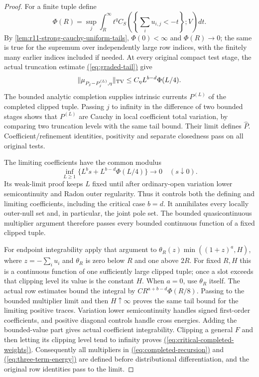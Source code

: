 \documentclass[11pt,reqno]{amsart}
\theoremstyle{definition}
\theoremstyle{remark}
\numberwithin{equation}{section}
\newcommand{\MathEqref}[1]{\begingroup\hypersetup{linkcolor=EquationLink}\hyperref[#1]{(\ref*{#1})}\endgroup}
\begin{document}
\begin{proof}
For a finite tuple define
\begin{equation}\label{eq:joint-tail-function}
 \Phi(R)=\sup_j\int_R^\infty t^q
          C_S\!\left(\left\{\sum_i u_{i,j}<-t\right\};V\right)dt.
\end{equation}
By \cref{lem:r11-strong-cauchy-uniform-tails},
$\Phi(0)<\infty$ and $\Phi(R)\to0$; the same is true for
the supremum over independently large row indices, with the
finitely many earlier indices included if needed. At every
original compact test stage, the actual truncation estimate \MathEqref{eq:graded-tail} give
\begin{equation}\label{eq:truncation-error}
 \|\mu_{P_j-P_j^{(L)},\eta}\|_{\rm TV}
             \leq C_\eta L^{b-d}\Phi(L/4).
\end{equation}
The bounded analytic completion supplies intrinsic currents
$P^{(L)}$ of the completed clipped tuple. Passing $j$ to
infinity in the difference of two bounded stages shows that
$P^{(L)}$ are Cauchy in local coefficient total variation,
by comparing two truncation levels with the same tail bound. Their limit defines $\widehat P$.
Coefficient/refinement identities, positivity and separate
closedness pass on all original tests.

The limiting coefficients have the common modulus
\begin{equation}\label{eq:coefficient-modulus}
    \inf_{L\geq1}\{L^b s+L^{b-d}\Phi(L/4)\}
                              \longrightarrow0\quad(s\downarrow0).
\end{equation}
Its weak-limit proof keeps $L$ fixed until after ordinary-open
variation lower semicontinuity and Radon outer regularity.
Thus it controls both the defining and limiting coefficients,
including the critical case $b=d$. It annihilates every
locally outer-null set and, in particular, the joint pole set.
The bounded quasicontinuous multiplier argument therefore
passes every bounded continuous function of a fixed clipped
tuple.

For endpoint integrability apply that argument to
$\theta_R(z)\min((1+z)^a,H)$, where
$z=-\sum_i u_i$ and $\theta_R$ is zero below $R$ and one
above $2R$. For fixed $R,H$ this is a continuous function
of one sufficiently large clipped tuple; once a slot exceeds
that clipping level its value is the constant $H$.
When $a=0$, use $\theta_R$ itself. The actual row estimates
bound the integral by
$C R^{a+b-d}\Phi(R/8)$. Passing to the bounded multiplier
limit and then $H\uparrow\infty$ proves the same tail bound
for the limiting positive traces. Variation lower
semicontinuity handles signed first-order coefficients, and
positive diagonal controls handle cross energies.
Adding the bounded-value part gives actual coefficient
integrability. Clipping a general $F$ and then letting its
clipping level tend to infinity proves \MathEqref{eq:critical-completed-weights}. Consequently
all multipliers in \MathEqref{eq:completed-recursion} and \MathEqref{eq:three-term-energy} are defined before
distributional differentiation, and the original row
identities pass to the limit.


\end{proof}
\end{document}
